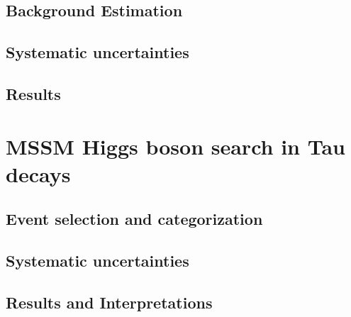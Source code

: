 \subsection{Background Estimation}

\subsection{Systematic uncertainties}

\subsection{Results}

\section{MSSM Higgs boson search in Tau decays}

\subsection{Event selection and categorization}

\subsection{Systematic uncertainties}

\subsection{Results and Interpretations}


